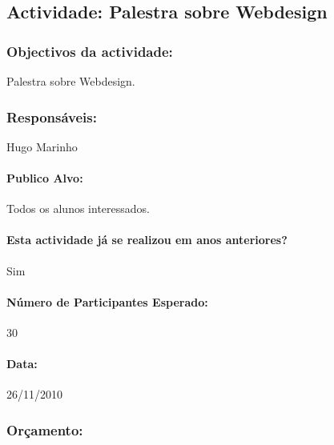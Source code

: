 \subsection{Actividade: Palestra sobre Webdesign} %

\subsubsection*{Objectivos da actividade:}
Palestra sobre Webdesign.

\subsubsection*{Responsáveis:}
\begin{itemizedash}
	\item{Hugo Marinho}
\end{itemizedash}

\paragraph{Publico Alvo: }
Todos os alunos interessados.

\paragraph{Esta actividade já se realizou em anos anteriores?}
Sim

\paragraph{Número de Participantes Esperado:}
30

\paragraph{Data:} 26/11/2010

\subsubsection*{Orçamento:}

